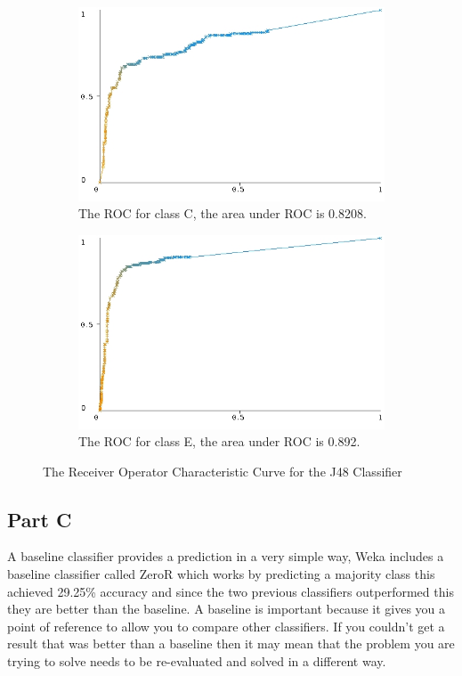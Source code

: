 \documentclass[10pt]{article}
\begin{document}
\begin{figure}
\begin{subfigure}[b]{0.475\textwidth}
        \includegraphics[width=\textwidth]{c45_roc/roc_curve_c.jpg}
        \caption[]%
        {{\small The ROC for class C, the area under ROC is 0.8208.}}    
        \label{fig:c45 roc curve class c}
    \end{subfigure}
    \quad
    \begin{subfigure}[b]{0.475\textwidth}   
        \centering 
        \includegraphics[width=\textwidth]{c45_roc/roc_curve_e(d).jpg}
        \caption[]%
        {{\small The ROC for class E, the area under ROC is 0.892.}}    
        \label{fig:c45 roc curve class d}
    \end{subfigure}
    \caption[The Receiver Operator Characteristic Curve for the J48 Classifier]
    {\small The Receiver Operator Characteristic Curve for the J48 Classifier} 
    \label{fig:c45 roc curves}
\end{figure}

\subsection*{Part C}
 A baseline classifier provides a prediction in a very simple way, Weka includes a baseline classifier called ZeroR which works by predicting a majority class this achieved 29.25\% accuracy and since the two previous classifiers outperformed this they are better than the baseline. A baseline is important because it gives you a point of reference to allow you to compare other classifiers. If you couldn't get a result that was better than a baseline then it may mean that the problem you are trying to solve needs to be re-evaluated and solved in a different way.
\end{document}
